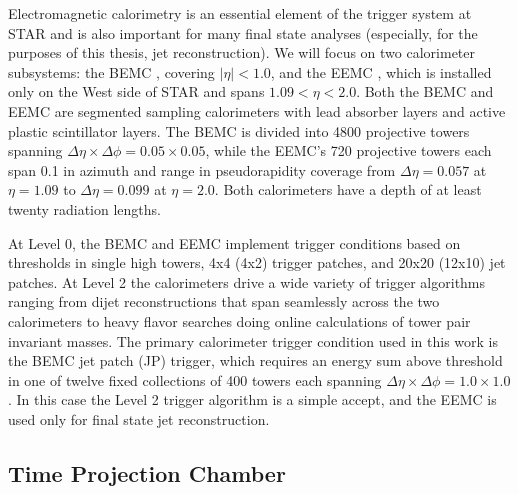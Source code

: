 Electromagnetic calorimetry is an essential element of the trigger system at STAR and is also important for many final state analyses (especially, for the purposes of this thesis, jet reconstruction).  We will focus on two calorimeter subsystems: the BEMC \cite{Beddo:2002zx}, covering $|\eta| < 1.0$, and the EEMC \cite{Allgower:2002zy}, which is installed only on the West side of STAR and spans $1.09 < \eta < 2.0$.  Both the BEMC and EEMC are segmented sampling calorimeters with lead absorber layers and active plastic scintillator layers.  The BEMC is divided into 4800 projective towers spanning $\Delta \eta \times \Delta \phi = 0.05 \times 0.05$, while the EEMC's 720 projective towers each span 0.1 in azimuth and range in pseudorapidity coverage from $\Delta \eta = 0.057$ at $\eta = 1.09$ to $\Delta \eta = 0.099$ at $\eta = 2.0$.  Both calorimeters have a depth of at least twenty radiation lengths.%

At Level 0, the BEMC and EEMC implement trigger conditions based on thresholds in single high towers, 4x4 (4x2) trigger patches, and 20x20 (12x10) jet patches.  At Level 2 the calorimeters drive a wide variety of trigger algorithms ranging from dijet reconstructions that span seamlessly across the two calorimeters to heavy flavor searches doing online calculations of tower pair invariant masses.  The primary calorimeter trigger condition used in this work is the BEMC jet patch (JP) trigger, which requires an energy sum above threshold in one of twelve fixed collections of 400 towers each spanning $\Delta \eta \times \Delta \phi = 1.0 \times 1.0$.  In this case the Level 2 trigger algorithm is a simple accept, and the EEMC is used only for final state jet reconstruction.


\subsection{Time Projection Chamber}

